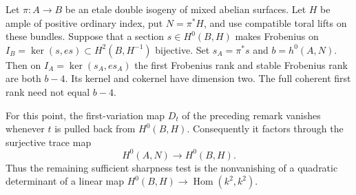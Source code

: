 \begin{lemma}
\label{lem:DE-A3-positive-index-double-corank-candidate}
Let $\pi:A\to B$ be an etale double isogeny of mixed abelian
surfaces. Let $H$ be ample of positive ordinary index, put
$N=\pi^*H$, and use compatible toral lifts on these bundles.
Suppose that a section $s\in H^0(B,H)$ makes Frobenius on
$I_B=\ker(s,es)\subset H^2(B,H^{-1})$ bijective.
Set $s_A=\pi^*s$ and $b=h^0(A,N)$.
Then on $I_A=\ker(s_A,es_A)$ the first Frobenius rank and stable
Frobenius rank are both $b-4$. Its kernel and cokernel have
dimension two. The full coherent first rank need not equal $b-4$.

For this point, the first-variation map $D_t$ of the preceding
remark vanishes whenever $t$ is pulled back from $H^0(B,H)$.
Consequently it factors through the surjective trace map
\[
 H^0(A,N)\longrightarrow H^0(B,H).
\]
Thus the remaining sufficient sharpness test is the nonvanishing
of a quadratic determinant of a linear map
$H^0(B,H)\to\operatorname{Hom}(k^2,k^2)$.
\end{lemma}
